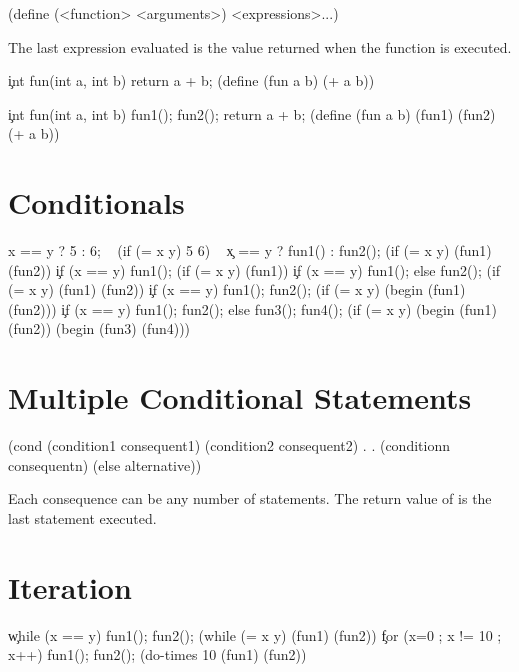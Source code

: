 \bdisplay
(define  (<function>  <arguments>)
    <expressions>...)
\edisplay

The last expression evaluated is the value returned when the function
is executed.

\bigskip

\c
int  fun(int a, int b)
\op
     return a + b;
\cp
\scheme
(define (fun a b)
     (+ a b))
\endcode

\c
int  fun(int a, int b)
\op
    fun1();
    fun2();
    return a + b;
\cp
\scheme
(define (fun a b)
    (fun1)
    (fun2)
    (+ a b))
\endcode

\vfil\break
 
\section{Conditionals}

\split x == y ? 5 : 6; ~ (if (= x y) 5 6) ~
\c
x == y ? fun1() : fun2();
\scheme
(if (= x y)
    (fun1)
    (fun2))
\endcode
\c
if (x == y)
    fun1();
\scheme
(if (= x y)
    (fun1))
\endcode
\c
if (x == y)
    fun1();
else
    fun2();
\scheme
(if (= x y)
    (fun1)
    (fun2))
\endcode
\c
if (x == y) \op
    fun1();
    fun2();
\cp
\scheme
(if (= x y)
    (begin
        (fun1)
        (fun2)))
\endcode
\c
if (x == y) \op
    fun1();
    fun2();
\cp else \op
    fun3();
    fun4();
\cp
\scheme
(if (= x y)
    (begin
        (fun1)
        (fun2))
    (begin
        (fun3)
        (fun4)))
\endcode

\section{Multiple Conditional Statements}

\bdisplay
(cond 
        (condition1  consequent1)
        (condition2  consequent2)
             .            .
        (conditionn  consequentn)
        (else  alternative))
\edisplay

Each consequence can be any number of statements.  The return value of
 is the last statement executed.



\section{Iteration}

\c
while (x == y) \op
    fun1();
    fun2();
\cp
\scheme
(while (= x y)
    (fun1)
    (fun2))
\endcode
\c
for (x=0 ; x != 10 ; x++) \op
    fun1();
    fun2();
\cp
\scheme
(do-times 10
    (fun1)
    (fun2))
\endcode

